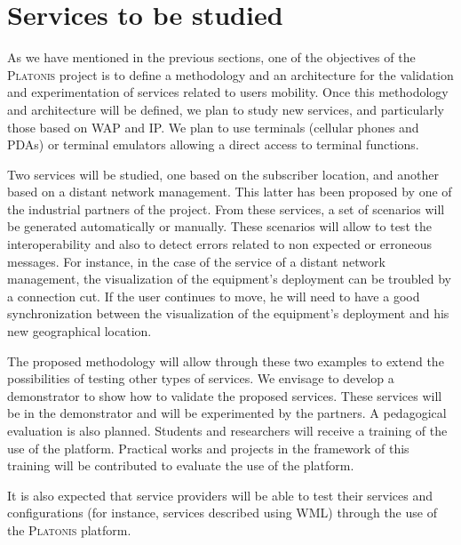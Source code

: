 \section{Services to be studied}
 
As we have mentioned in the previous sections, one of the objectives of the 
\textsc{Platonis} project is to define a methodology and an
architecture for the validation and experimentation of services
related to users mobility. Once this methodology and architecture
will be defined, we plan to study new services, and particularly those
based on WAP and IP. We plan to use terminals (cellular phones and
PDAs) or terminal emulators allowing a direct access to terminal
functions. 

Two services will be studied, one based on the subscriber location,
and another based on a distant network management. This latter has
been proposed by one of the industrial partners of the project. From
these services, a set of scenarios will be generated automatically or
manually. These scenarios will allow to test the interoperability and
also to detect errors related to non expected or erroneous
messages. For instance, in the case of the service of a distant
network management, the visualization of the equipment's deployment
can be troubled by a connection cut. If the user continues to move, he
will need to have a good synchronization between the visualization of
the equipment's deployment and his new geographical location.

The proposed methodology will allow through these two examples to extend the 
possibilities of testing other types of services. We envisage to develop a 
demonstrator to show how to validate the proposed services. These services 
will be in the demonstrator and will be experimented by the partners. A 
pedagogical evaluation is also planned. Students and researchers will 
receive a training of the use of the platform. Practical works and projects 
in the framework of this training will be contributed to evaluate the use of 
the platform. 

It is also expected that service providers will be able to test their
services and configurations (for instance, services described using
WML) through the use of the \textsc{Platonis} platform.
